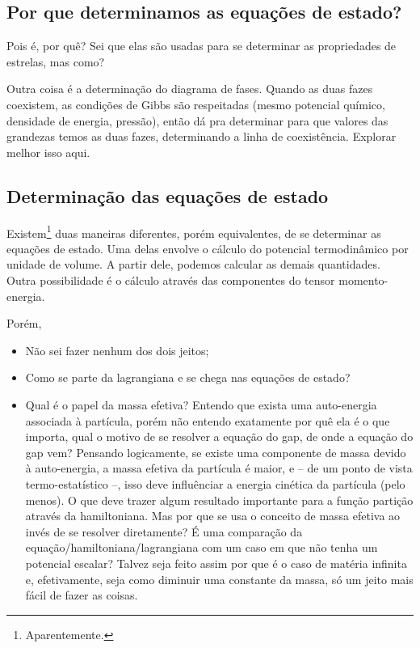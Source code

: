 \subsection{Por que determinamos as equações de estado?}

Pois é, por quê? Sei que elas são usadas para se determinar as propriedades de estrelas, mas como?

Outra coisa é a determinação do diagrama de fases. Quando as duas fazes coexistem, as condições de Gibbs são respeitadas (mesmo potencial químico, densidade de energia, pressão), então dá pra determinar para que valores das grandezas temos as duas fazes, determinando a linha de coexistência. Explorar melhor isso aqui.

\subsection{Determinação das equações de estado}

Existem\footnote{Aparentemente.} duas maneiras diferentes, porém equivalentes, de se determinar as equações de estado. Uma delas envolve o cálculo do potencial termodinâmico por unidade de volume. A partir dele, podemos calcular as demais quantidades. Outra possibilidade é o cálculo através das componentes do tensor momento-energia.

Porém,
\begin{itemize}
	\item Não sei fazer nenhum dos dois jeitos;
	\item Como se parte da lagrangiana e se chega nas equações de estado?
	\item Qual é o papel da massa efetiva? Entendo que exista uma auto-energia associada à partícula, porém não entendo exatamente por quê ela é o que importa, qual o motivo de se resolver a equação do gap, de onde a equação do gap vem? Pensando logicamente, se existe uma componente de massa devido à auto-energia, a massa efetiva da partícula é maior, e -- de um ponto de vista termo-estatístico --, isso deve influênciar a energia cinética da partícula (pelo menos). O que deve trazer algum resultado importante para a função partição através da hamiltoniana. Mas por que se usa o conceito de massa efetiva ao invés de se resolver diretamente? É uma comparação da equação/hamiltoniana/lagrangiana com um caso em que não tenha um potencial escalar? Talvez seja feito assim por que é o caso de matéria infinita e, efetivamente, seja como diminuir uma constante da massa, só um jeito mais fácil de fazer as coisas.
\end{itemize}

